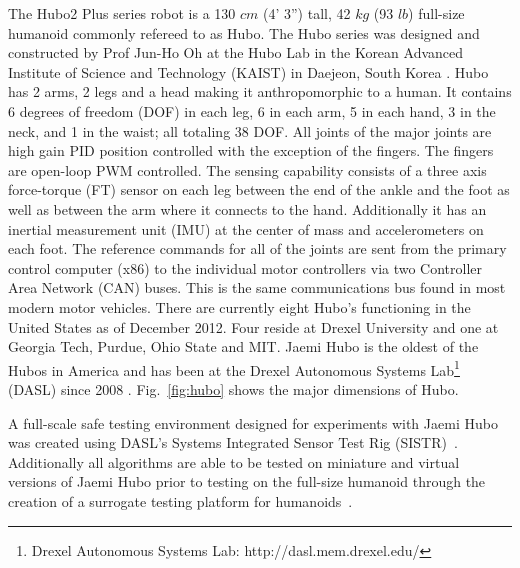 The Hubo2 Plus series robot is a 130 $cm$ (4' 3'') tall, 42 $kg$ (93 $lb$) full-size humanoid commonly refereed to as Hubo.  
The Hubo series was designed and constructed by Prof Jun-Ho Oh at the Hubo Lab in the Korean Advanced Institute of Science and Technology (KAIST) in Daejeon, South Korea \cite{hubofirst}.
Hubo has 2 arms, 2 legs and a head making it anthropomorphic to a human.
It contains 6 degrees of freedom (DOF) in each leg, 6 in each arm, 5 in each hand, 3 in the neck, and 1 in the waist; all totaling 38 DOF.
All joints of the major joints are high gain PID position controlled with the exception of the fingers.
The fingers are open-loop PWM controlled.
The sensing capability consists of a three axis force-torque (FT) sensor on each leg between the end of the ankle and the foot as well as between the arm where it connects to the hand.
Additionally it has an inertial measurement unit (IMU) at the center of mass and accelerometers on each foot.
The reference commands for all of the joints are sent from the primary control computer (x86) to the individual motor controllers via two Controller Area Network (CAN) buses.
This is the same communications bus found in most modern motor vehicles.
There are currently eight Hubo's functioning in the United States as of December 2012.
Four reside at Drexel University and one at Georgia Tech, Purdue, Ohio State and MIT.
Jaemi Hubo is the oldest of the Hubos in America and has been at the Drexel Autonomous Systems Lab\footnote{Drexel Autonomous Systems Lab: http://dasl.mem.drexel.edu/} (DASL) since 2008 \cite{jaemiHuboSRM}.
Fig.~\ref{fig:hubo} shows the major dimensions of Hubo.

A full-scale safe testing environment designed for experiments with Jaemi Hubo was created using DASL's Systems Integrated Sensor Test Rig (SISTR)~\cite{5686325}.  
Additionally all algorithms are able to be tested on miniature and virtual versions of Jaemi Hubo prior to testing on the full-size humanoid through the creation of a surrogate testing platform for humanoids~\cite{5379582}.

